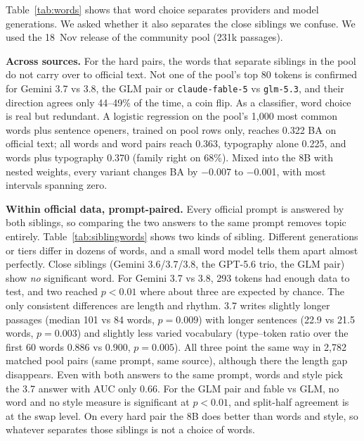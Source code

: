 \documentclass[10pt,twocolumn,letterpaper]{article}
\begin{document}
Table~\ref{tab:words} shows that word choice separates providers and model generations. We asked whether it also separates the close siblings we confuse. We used the 18~Nov release of the community pool (231k passages).

\textbf{Across sources.} For the hard pairs, the words that separate siblings in the pool do not carry over to official text. Not one of the pool's top 80 tokens is confirmed for Gemini 3.7 vs 3.8, the GLM pair or \texttt{claude-fable-5} vs \texttt{glm-5.3}, and their direction agrees only 44--49\% of the time, a coin flip. As a classifier, word choice is real but redundant. A logistic regression on the pool's 1,000 most common words plus sentence openers, trained on pool rows only, reaches 0.322 BA on official text; all words and word pairs reach 0.363, typography alone 0.225, and words plus typography 0.370 (family right on 68\%). Mixed into the 8B with nested weights, every variant changes BA by $-$0.007 to $-$0.001, with most intervals spanning zero.

\textbf{Within official data, prompt-paired.} Every official prompt is answered by both siblings, so comparing the two answers to the same prompt removes topic entirely. Table~\ref{tab:siblingwords} shows two kinds of sibling. Different generations or tiers differ in dozens of words, and a small word model tells them apart almost perfectly. Close siblings (Gemini 3.6/3.7/3.8, the GPT-5.6 trio, the GLM pair) show \emph{no} significant word. For Gemini 3.7 vs 3.8, 293 tokens had enough data to test, and two reached $p<0.01$ where about three are expected by chance. The only consistent differences are length and rhythm. 3.7 writes slightly longer passages (median 101 vs 84 words, $p=0.009$) with longer sentences (22.9 vs 21.5 words, $p=0.003$) and slightly less varied vocabulary (type--token ratio over the first 60 words 0.886 vs 0.900, $p=0.005$). All three point the same way in 2,782 matched pool pairs (same prompt, same source), although there the length gap disappears. Even with both answers to the same prompt, words and style pick the 3.7 answer with AUC only 0.66. For the GLM pair and fable vs GLM, no word and no style measure is significant at $p<0.01$, and split-half agreement is at the swap level. On every hard pair the 8B does better than words and style, so whatever separates those siblings is not a choice of words.
\end{document}
